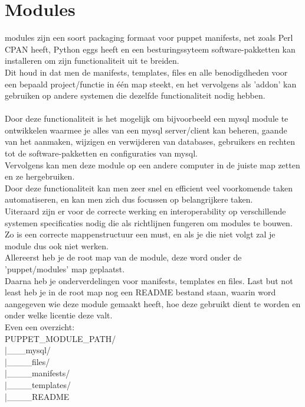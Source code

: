 \chapter{Modules}

modules zijn een soort packaging formaat voor puppet manifests, net zoals Perl CPAN heeft, Python eggs heeft en een besturingssyteem software-pakketten kan installeren om zijn functionaliteit uit te breiden.\\
Dit houd in dat men de manifests, templates, files en alle benodigdheden voor een bepaald project/functie in één map steekt, en het vervolgens als 'addon' kan gebruiken op andere systemen die dezelfde functionaliteit nodig hebben.\\
\\
Door deze functionaliteit is het mogelijk om bijvoorbeeld een mysql module te ontwikkelen waarmee je alles van een mysql server/client kan beheren, gaande van het aanmaken, wijzigen en verwijderen van databases, gebruikers en rechten tot de software-pakketten en configuraties van mysql.\\
Vervolgens kan men deze module op een andere computer in de juiste map zetten en ze hergebruiken.\\
Door deze functionaliteit kan men zeer snel en efficient veel voorkomende taken automatiseren, en kan men zich dus focussen op belangrijkere taken.\\

Uiteraard zijn er voor de correcte werking en interoperability op verschillende systemen specificaties nodig die als richtlijnen fungeren om modules te bouwen.\\
Zo is een correcte mappenstructuur een must, en als je die niet volgt zal je module dus ook niet werken.\\
Allereerst heb je de root map van de module, deze word onder de 'puppet/modules' map geplaatst.\\
Daarna heb je onderverdelingen voor manifests, templates en files. Last but not least heb je in de root map nog een README bestand staan, waarin word aangegeven wie deze module gemaakt heeft, hoe deze gebruikt dient te worden en onder welke licentie deze valt.\\

Even een overzicht:\\

PUPPET\_MODULE\_PATH/\\
|\_\_\_mysql/\\
	|\_\_\_\_files/\\
	|\_\_\_\_manifests/\\
	|\_\_\_\_templates/\\
	|\_\_\_\_README\\
